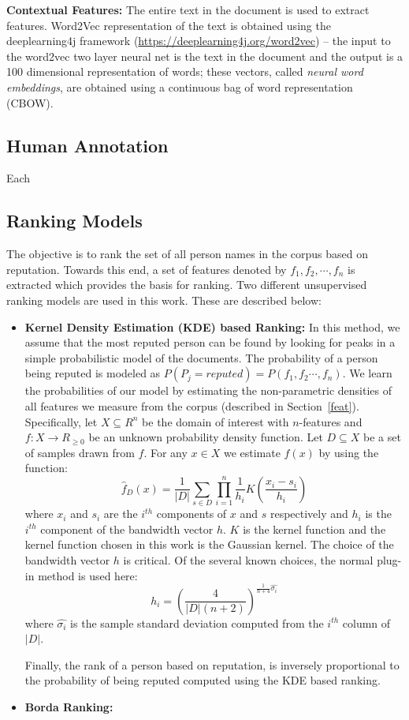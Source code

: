 \documentclass[a4paper,man,natbib]{apa6}
\begin{document}
\noindent \textbf{Contextual Features: } The entire text in the document is used to extract features. Word2Vec representation \cite{Mikolov_13} of the text is obtained using the deeplearning4j framework (\url{https://deeplearning4j.org/word2vec}) -- the input to the word2vec two layer neural net is the text in the document and the output is a 100 dimensional representation of words; these vectors, called \emph{neural word embeddings}, are obtained using a continuous bag of word representation (CBOW). 


\subsection{Human Annotation}
Each 

\subsection{Ranking Models}
The objective is to rank the set of all person names in the corpus based on reputation. Towards this end, a set of features denoted by $f_1,f_2, \cdots, f_n$ is extracted which provides the basis for ranking. Two different unsupervised ranking models are used in this work. These are described below:
\begin{itemize}
\item \textbf{Kernel Density Estimation (KDE) based Ranking: } In this method, we assume that the most reputed person can be found by looking for peaks in a simple probabilistic model of the documents. The probability of a person being reputed is modeled as $P(P_j = reputed) = P(f_1,f_2 \cdots, f_n)$. We learn the probabilities of our model by estimating the non-parametric densities of all features we measure from the corpus (described in Section~\ref{feat}). Specifically, let $X \subseteq R^n$ be the domain of interest with $n$-features and $f: X \rightarrow R_{\ge 0}$ be an unknown probability density function. Let $D \subseteq X$ be a set of samples drawn from $f$. For any $x \in X$ we estimate $f(x)$ by using the function:
\begin{equation}
\label{eqn1}
\hat{f}_D(x) = \frac{1}{|D|} \sum_{s \in D} \prod_{i=1}^{n} \frac{1}{h_i} K(\frac{x_i - s_i}{h_i})
\end{equation}
where $x_i$ and $s_i$ are the $i^{th}$ components of $x$ and $s$ respectively and $h_i$ is the $i^{th}$ component of the bandwidth vector $h$. $K$ is the kernel function and the kernel function chosen in this work is the Gaussian kernel. The choice of the bandwidth vector $h$ is critical. Of the several known choices, the normal plug-in method is used here:
\begin{equation}
\label{eqn2}
h_i = (\frac{4}{|D| (n+2)})^{\frac{1}{n+4} \hat{\sigma_i}}
\end{equation}
where $ \hat{\sigma_i}$ is the sample standard deviation computed from the $i^{th}$ column of $|D|$.

Finally, the rank of a person based on reputation, is inversely proportional to the probability of being reputed computed using the KDE based ranking.  
 \item \textbf{Borda Ranking: } 
\end{itemize}
\end{document}
